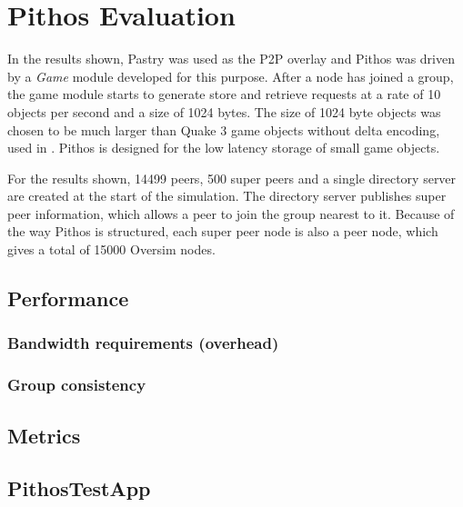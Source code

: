 \chapter{Pithos Evaluation}
    \label{chp:EVALUATION}

In the results shown, Pastry was used as the P2P overlay and Pithos was driven by a \emph{Game} module developed for this purpose. After a node has
joined a group, the game module starts to generate store and retrieve requests at a rate of 10 objects per second and a size of 1024 bytes. The size
of 1024 byte objects was chosen to be much larger than Quake 3 game objects without delta encoding, used in \cite{Bharambe_Donnybrook}. Pithos is
designed for the low latency storage of small game objects.

For the results shown, 14499 peers, 500 super peers and a single directory server are created at the start of the simulation. The directory server
publishes super peer information, which allows a peer to join the group nearest to it. Because of the way Pithos is structured, each super peer node is also a peer node, which gives a total of 15000 Oversim nodes.

    \section{Performance}

    \subsection{Bandwidth requirements (overhead)}

        \subsection{Group consistency}

    \section{Metrics}

    \section{PithosTestApp}

